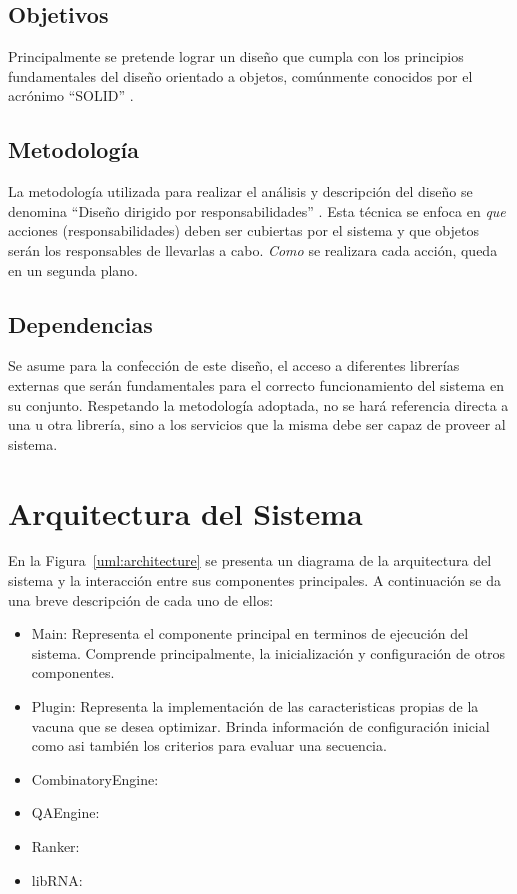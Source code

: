 \documentclass[a4paper,10pt]{article}
\begin{document}
  \subsection{Objetivos}
  Principalmente se pretende lograr un dise\~no que cumpla con los principios
fundamentales del dise\~no orientado a objetos, com\'unmente conocidos por el
acr\'onimo ``SOLID'' \cite{martin00}.
  
  \subsection{Metodolog\'ia}
  La metodolog\'ia utilizada para realizar el an\'alisis y descripci\'on del
dise\~no se denomina ``Dise\~no dirigido por responsabilidades''
\cite{wirfsbrok03}. Esta t\'ecnica se enfoca en \textit{que} acciones
(responsabilidades) deben ser cubiertas por el sistema y que objetos ser\'an los
responsables de llevarlas a cabo. \textit{Como} se realizara cada acci\'on,
queda en un segunda plano.

  \subsection{Dependencias}
  Se asume para la confecci\'on de este dise\~no, el acceso a diferentes
librer\'ias externas que ser\'an fundamentales para el correcto funcionamiento
del
sistema en su conjunto.
  Respetando la metodolog\'ia adoptada, no se har\'a referencia directa a una u
otra librer\'ia, sino a los servicios que la misma debe ser capaz de proveer al
sistema.

\section{Arquitectura del Sistema}
  \label{architecture}
  En la Figura~\ref{uml:architecture} se presenta un diagrama de la
arquitectura del sistema y la interacci\'on entre sus componentes principales.
A continuaci\'on se da una breve descripci\'on de cada uno de ellos:

  \begin{itemize}
   \item Main: Representa el componente principal en terminos de ejecuci\'on
del sistema. Comprende principalmente, la inicializaci\'on y configuraci\'on de
otros componentes.

   \item Plugin: Representa la implementaci\'on de las caracteristicas propias
de la vacuna que se desea optimizar. Brinda informaci\'on de configuraci\'on
inicial como asi tambi\'en los criterios para evaluar una secuencia.

   \item CombinatoryEngine: 

   \item QAEngine:

   \item Ranker:

   \item libRNA:

  \end{itemize}
\end{document}
